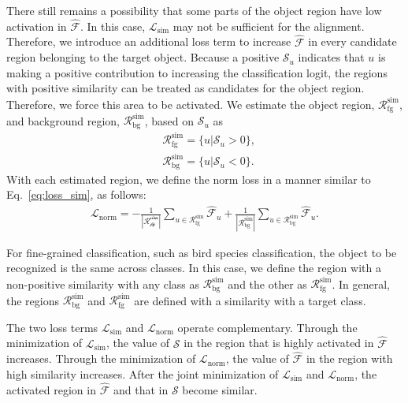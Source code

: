 There still remains a possibility that some parts of the object region have low activation in $\hat{\mathcal{F}}$.
In this case, $\mathcal{L}_\text{sim}$ may not be sufficient for the alignment.
Therefore, we introduce an additional loss term to increase $\hat{\mathcal{F}}$ in every candidate region belonging to the target object.
Because a positive $\mathcal{S}_u$ indicates that $u$ is making a positive contribution to increasing the classification logit, the regions with positive similarity can be treated as candidates for the object region. Therefore, we force this area to be activated.
We estimate the object region, $\mathcal{R}^\text{sim}_\text{fg}$, and background region, $\mathcal{R}^\text{sim}_\text{bg}$, based on $\mathcal{S}_u$ as
\begin{equation}
\begin{aligned}
&\mathcal{R}^\text{sim}_\text{fg}=\{u|\mathcal{S}_u>0\},\\
&\mathcal{R}^\text{sim}_\text{bg}=\{u|\mathcal{S}_u<0\}.
\end{aligned}
\end{equation}
With each estimated region, we define the norm loss in a manner similar to Eq.~\ref{eq:loss_sim}, as follows:
\begin{equation}\label{eq:loss_norm}
\begin{aligned}
\mathcal{L}_\text{norm} = -\frac{1}{|\mathcal{\mathcal{R}^\text{sim}_\text{fg}}|}\sum_{u\in \mathcal{R}^\text{sim}_\text{fg}}{\hat{\mathcal{F}}_u} +\frac{1}{|\mathcal{R}^\text{sim}_\text{bg}|}\sum_{u\in \mathcal{R}^\text{sim}_\text{bg}}{\hat{\mathcal{F}}_u}.
\end{aligned}
\end{equation}

For fine-grained classification, such as bird species classification, the object to be recognized is the same across classes. In this case, we define the region with a non-positive similarity with any class as $\mathcal{R}^\text{sim}_\text{bg}$ and the other as $\mathcal{R}^\text{sim}_\text{fg}$. In general, the regions $\mathcal{R}^\text{sim}_\text{bg}$ and $\mathcal{R}^\text{sim}_\text{fg}$ are defined with a similarity with a target class.

The two loss terms $\mathcal{L}_\text{sim}$ and $\mathcal{L}_\text{norm}$ operate complementary.
Through the minimization of $\mathcal{L}_\text{sim}$, the value of $\mathcal{S}$ in the region that is highly activated in $\hat{\mathcal{F}}$ increases.
Through the minimization of $\mathcal{L}_\text{norm}$, the value of $\hat{\mathcal{F}}$ in the region with high similarity increases.
After the joint minimization of $\mathcal{L}_\text{sim}$ and $\mathcal{L}_\text{norm}$, the activated region in $\hat{\mathcal{F}}$  and that in $\mathcal{S}$ become similar.


